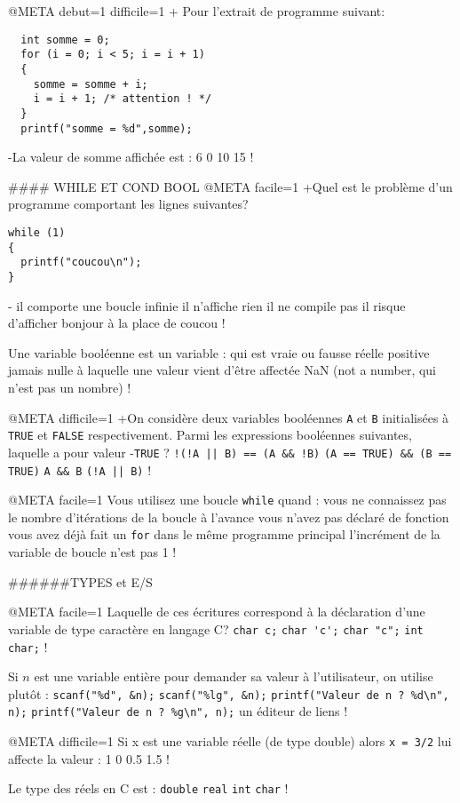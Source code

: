 @META debut=1 difficile=1
+ Pour l'extrait de programme suivant: 
 \begin{verbatim} 
  int somme = 0;
  for (i = 0; i < 5; i = i + 1) 
  {
    somme = somme + i;
    i = i + 1; /* attention ! */
  }
  printf("somme = %d",somme); 
\end{verbatim}
-La valeur de somme affichée est : 
 6
 0
 10
 15
!

#### WHILE ET COND BOOL
@META facile=1
+Quel est le problème d'un programme comportant les lignes suivantes?
\begin{verbatim}
while (1)
{
  printf("coucou\n");
}
\end{verbatim}
-
  il comporte une boucle infinie
  il n'affiche rien
  il ne compile pas
  il risque d'afficher bonjour à la place de coucou
!

Une variable booléenne est un variable :
 qui est vraie ou fausse
 réelle positive
 jamais nulle
 à laquelle une valeur vient d'être affectée
 NaN (not a number, qui n'est pas un nombre)
! 


@META difficile=1
+On considère deux variables booléennes \verb|A| et \verb|B|
initialisées à \verb|TRUE| et \verb|FALSE| respectivement. Parmi
les expressions booléennes suivantes, laquelle a pour valeur
-\verb|TRUE| ?
 \verb+!(!A || B) == (A && !B)+
 \verb|(A == TRUE) && (B == TRUE)|
 \verb|A && B|
 \verb+(!A || B)+
!

@META facile=1
Vous utilisez une boucle \verb|while| quand :
 vous ne connaissez pas le nombre d'itérations de la boucle à l'avance
 vous n'avez pas déclaré de fonction
 vous avez déjà fait un  \verb|for| dans le même programme principal 
 l'incrément de la variable de boucle n'est pas 1
!


######TYPES et E/S

@META facile=1
Laquelle de ces écritures correspond à la déclaration d'une variable de type caractère en langage C?
 \verb|char c;|
 \verb|char 'c';|
 \verb|char "c";|
 \verb|int char;|
!


Si $n$ est une variable entière pour demander sa valeur à l'utilisateur, on utilise plutôt :
 \verb+scanf("%d", &n);+
 \verb+scanf("%lg", &n);+
 \verb+printf("Valeur de n ? %d\n", n);+
 \verb+printf("Valeur de n ? %g\n", n);+
  un éditeur de liens
!

@META difficile=1
Si x est une variable réelle (de type double) alors \verb|x = 3/2| lui affecte la valeur :
  1
  0
  0.5
  1.5
!

Le type des réels en C est :
 \verb+double+
 \verb+real+
 \verb+int+
 \verb+char+
!

